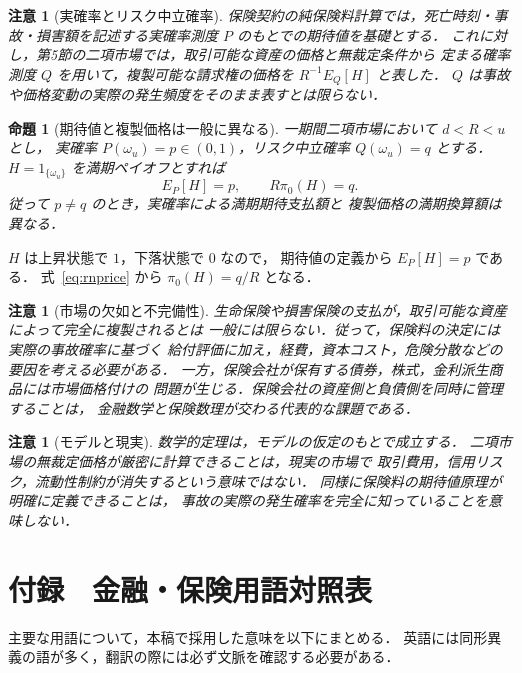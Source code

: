 \documentclass[a5paper,10pt,onecolumn]{jsarticle}
\makeatletter
\theoremstyle{mathnotetheorem}
\newtheorem{proposition}[theorem]{命題}
\newtheorem{remark}[theorem]{注意}
\renewcommand{\proofname}{証明}
\renewenvironment{proof}[1][\proofname]{%
  \par\pushQED{\qed}\normalfont\topsep4\p@\@plus2\p@\relax
  \trivlist\item[\hskip\labelsep\bfseries #1]\ignorespaces
}{\popQED\endtrivlist\@endpefalse}
\makeatother
\begin{document}
\begin{remark}[実確率とリスク中立確率]
保険契約の純保険料計算では，死亡時刻・事故・損害額を記述する実確率測度
$P$ のもとでの期待値を基礎とする．
これに対し，第5節の二項市場では，取引可能な資産の価格と無裁定条件から
定まる確率測度 $Q$ を用いて，複製可能な請求権の価格を
$R^{-1}E_Q[H]$ と表した．
$Q$ は事故や価格変動の実際の発生頻度をそのまま表すとは限らない．
\end{remark}

\begin{proposition}[期待値と複製価格は一般に異なる]\label{prop:different}
一期間二項市場において $d<R<u$ とし，
実確率 $P(\omega_u)=p\in(0,1)$，リスク中立確率 $Q(\omega_u)=q$ とする．
$H=1_{\{\omega_u\}}$ を満期ペイオフとすれば
\[
 E_P[H]=p,\qquad R\pi_0(H)=q.
\]
従って $p\ne q$ のとき，実確率による満期期待支払額と
複製価格の満期換算額は異なる．
\end{proposition}
\begin{proof}
$H$ は上昇状態で $1$，下落状態で $0$ なので，
期待値の定義から $E_P[H]=p$ である．
式~\eqref{eq:rnprice} から
$\pi_0(H)=q/R$ となる．\end{proof}

\begin{remark}[市場の欠如と不完備性]
生命保険や損害保険の支払が，取引可能な資産によって完全に複製されるとは
一般には限らない．従って，保険料の決定には実際の事故確率に基づく
給付評価に加え，経費，資本コスト，危険分散などの要因を考える必要がある．
一方，保険会社が保有する債券，株式，金利派生商品には市場価格付けの
問題が生じる．保険会社の資産側と負債側を同時に管理することは，
金融数学と保険数理が交わる代表的な課題である．
\end{remark}

\begin{remark}[モデルと現実]
数学的定理は，モデルの仮定のもとで成立する．
二項市場の無裁定価格が厳密に計算できることは，現実の市場で
取引費用，信用リスク，流動性制約が消失するという意味ではない．
同様に保険料の期待値原理が明確に定義できることは，
事故の実際の発生確率を完全に知っていることを意味しない．
\end{remark}

\section*{付録　金融・保険用語対照表}

主要な用語について，本稿で採用した意味を以下にまとめる．
英語には同形異義の語が多く，翻訳の際には必ず文脈を確認する必要がある．
\end{document}
